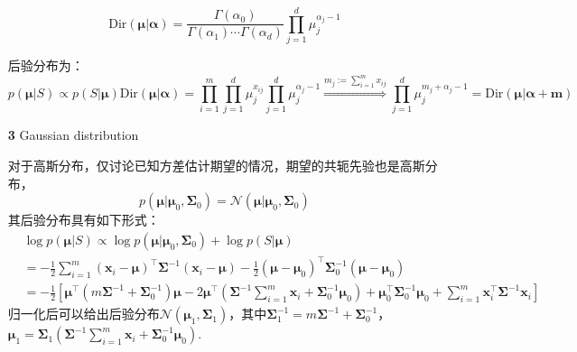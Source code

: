 \documentclass{article}
\begin{document}
\begin{itemize}
\begin{scriptsize}
\begin{spacing}{1.2}
{	\begin{equation*}
	\mathrm{Dir} (\bm{\mu}|\bm{\alpha}) = \frac{\Gamma(\alpha_0)}{\Gamma(\alpha_1)\cdots\Gamma(\alpha_d)}  \prod_{j=1}^d \mu_j^{\alpha_j-1}
	\end{equation*}
	
	后验分布为：
	\begin{equation*}
	p(\bm{\mu}|S) \propto p(S|\bm{\mu}) \mathrm{Dir} (\bm{\mu}|\bm{\alpha}) =\prod_{i=1}^m \prod_{j=1}^d \mu_j^{x_{ij}} \prod_{j=1}^d \mu_j^{\alpha_j-1} \overset{m_j:=\sum_{i=1}^m x_{ij}}{\Longrightarrow}  \prod_{j=1}^d \mu_j^{m_j+\alpha_j-1} = \mathrm{Dir} (\bm{\mu}|\bm{\alpha}+\bm{m})
	\end{equation*}
	}
	\end{spacing}
	\end{scriptsize}
	\vspace{-2mm}
	
	\item [\textbf{3}] Gaussian distribution

	\vspace{1mm}
	\begin{scriptsize}
	\begin{spacing}{1.2}
	{\sffamily
	对于高斯分布，仅讨论已知方差估计期望的情况，期望的共轭先验也是高斯分布，
	\begin{equation*}
	p(\bm{\mu}|\bm{\mu}_0, \bm{\Sigma}_0)=\mathcal{N}(\bm{\mu}|\bm{\mu}_0, \bm{\Sigma}_0)
	\end{equation*}
其后验分布具有如下形式：
	\begin{equation*}
	\begin{split}
	& \log p(\bm{\mu}|S) \propto \log p(\bm{\mu}|\bm{\mu}_0, \bm{\Sigma}_0) + \log p(S|\bm{\mu}) \\
	&= -\frac{1}{2} \sum_{i=1}^m  (\bm{x}_i-\bm{\mu})^\top \bm{\Sigma}^{-1}  (\bm{x}_i-\bm{\mu}) -\frac{1}{2}(\bm{\mu}-\bm{\mu}_0)^\top \bm{\Sigma}_0^{-1} (\bm{\mu}-\bm{\mu}_0) \\
	&= -\frac{1}{2} \left[ \bm{\mu}^\top (m\bm{\Sigma}^{-1} + \bm{\Sigma}_0^{-1}) \bm{\mu} - 2 \bm{\mu}^\top \left(\bm{\Sigma}^{-1} \sum_{i=1}^m \bm{x}_i + \bm{\Sigma}_0^{-1} \bm{\mu}_0\right) + \bm{\mu}_0^\top \bm{\Sigma}_0^{-1} \bm{\mu}_0 + \sum_{i=1}^m \bm{x}_i^\top \bm{\Sigma}^{-1} \bm{x}_i\right]
	\end{split}
	\end{equation*}
归一化后可以给出后验分布$\mathcal{N}(\bm{\mu}_1,\bm{\Sigma}_1)$，其中$\bm{\Sigma}_1^{-1}=m\bm{\Sigma}^{-1} + \bm{\Sigma}_0^{-1}$，$\bm{\mu}_1=\bm{\Sigma}_1(\bm{\Sigma}^{-1} \sum_{i=1}^m \bm{x}_i + \bm{\Sigma}_0^{-1} \bm{\mu}_0)$.
	}
	\end{spacing}
	\end{scriptsize}
	\vspace{-2mm}
	
	\end{itemize}
	
\end{document}
